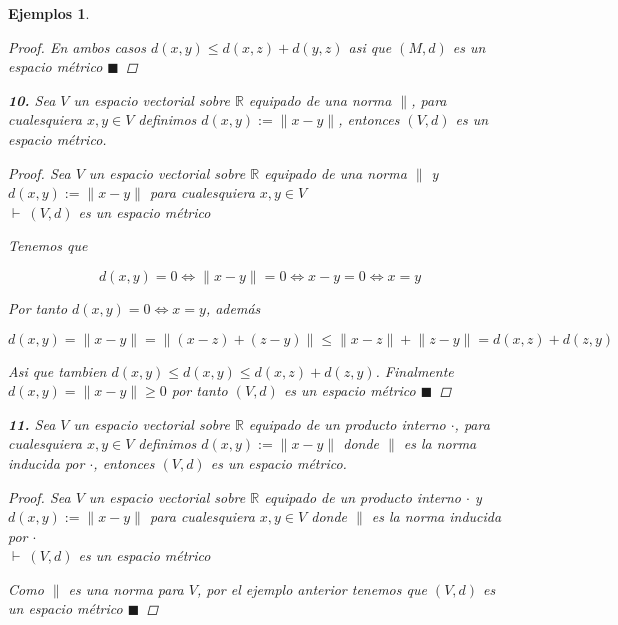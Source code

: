 \documentclass[oneside]{book} %
\theoremstyle{Teorema}
\theoremstyle{Ejemplos}
\newtheorem{Ejemplos}[Definicion]{Ejemplos}
\theoremstyle{[Obs]}
\newcommand{\norm}[1]{\lVert#1\rVert} %
\newcommand{\normSymbol}{\lVert} %
\renewcommand{\{}{\left\lbrace} %
\renewcommand{\}}{\right\rbrace} %
\newcommand{\R}{\mathbb{R}} %
\renewcommand{\qed}{$\blacksquare$} %
\newcommand{\pd}{$\vdash\ $} %
\begin{document}
\begin{Ejemplos}
\begin{proof}
					En ambos casos $d(x, y) \leq d(x, z) + d(y, z)$ asi que $(M, d)$ es un espacio métrico \qed

				\end{proof}

				\textbf{10.} Sea $V$ un espacio vectorial sobre $\R$ equipado de una norma $\normSymbol$, para cualesquiera $x, y \in V$ definimos $d(x, y) := \norm{x - y}$, entonces $(V, d)$ es un espacio métrico. 

				\begin{proof}
					
					Sea $V$ un espacio vectorial sobre $\R$ equipado de una norma $\normSymbol$ y $d(x, y) := \norm{x - y}$ para cualesquiera $x, y \in V$ \\
					\pd $(V, d)$ es un espacio métrico

					Tenemos que 
					
					\[ d(x, y) = 0 \Leftrightarrow \norm{x - y} = 0 \Leftrightarrow x - y = 0 \Leftrightarrow x = y \]

					Por tanto $d(x, y) = 0 \Leftrightarrow x = y$, además 

					\[ d(x, y) = \norm{x - y} = \norm{(x - z) + (z - y)} \leq \norm{x - z} + \norm{z - y} = d(x, z) + d(z, y) \]

					Asi que tambien $d(x, y) \leq d(x, y) \leq d(x, z) + d(z, y)$. Finalmente $d(x, y) = \norm{x - y} \geq 0$ por tanto $(V, d)$ es un espacio métrico \qed

				\end{proof}

				\textbf{11.} Sea $V$ un espacio vectorial sobre $\R$ equipado de un producto interno $\cdot$, para cualesquiera $x, y \in V$ definimos $d(x, y) := \norm{x - y}$ donde $\normSymbol$ es la norma inducida por $\cdot$, entonces $(V, d)$ es un espacio métrico. 

				\begin{proof}
					
					Sea $V$ un espacio vectorial sobre $\R$ equipado de un producto interno $\cdot$ y $d(x, y) := \norm{x - y}$ para cualesquiera $x, y \in V$ donde $\normSymbol$ es la norma inducida por $\cdot$ \\
					\pd $(V, d)$ es un espacio métrico

					Como $\normSymbol$ es una norma para $V$, por el ejemplo anterior tenemos que $(V, d)$ es un espacio métrico \qed

				\end{proof}
			
			\end{Ejemplos}
\end{document}
